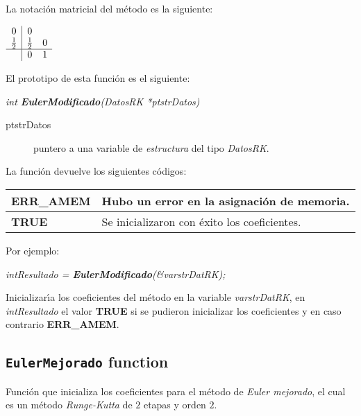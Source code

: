 La notaci\'on matricial del m\'etodo es la siguiente:

\begin{center}
$
\begin{array}{c|cc}
0 & 0 \\
\frac{1}{2} & \frac{1}{2} & 0 \\
\hline
 & 0 & 1
\end{array}
$
\end{center}

El prototipo de esta funci\'on es el siguiente:

\begin{center}
\emph{int \textbf{EulerModificado}(DatosRK *ptstrDatos)}
\end{center}

\begin{description}
\item[ptstrDatos] puntero a una variable de \emph{estructura} del tipo
\emph{DatosRK}.
\end{description}

La funci\'on devuelve los siguientes c\'odigos:

\begin{center}
\begin{tabular}{|l|l|}
\hline
\textbf{ERR\_AMEM} & Hubo un error en la asignaci\'on de memoria. \\
\hline
\textbf{TRUE} & Se inicializaron con \'exito los coeficientes. \\
\hline
\end{tabular}
\end{center}

Por ejemplo:

\begin{center}
\emph{intResultado = \textbf{EulerModificado}(\&varstrDatRK);}
\end{center}


Inicializar\'{\i}a los coeficientes del m\'etodo en la variable
\emph{varstrDatRK}, en \emph{intResultado} el valor \textbf{TRUE} si se pudieron
inicializar los coeficientes y en caso contrario \textbf{ERR\_AMEM}.

\subsection{\texttt{EulerMejorado} function}

Funci\'on que inicializa los coeficientes para el m\'etodo de \emph{Euler mejorado},
el cual es un m\'etodo \emph{Runge-Kutta} de $2$ etapas y orden $2$.\newline

